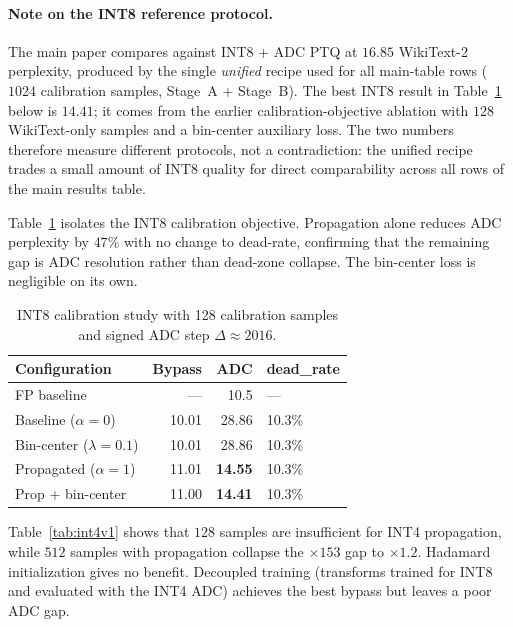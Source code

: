\documentclass[letterpaper]{article} %
\theoremstyle{plain}
\begin{document}
\paragraph{Note on the INT8 reference protocol.}
The main paper compares against INT8 + ADC PTQ at $16.85$ WikiText-2 perplexity, produced by the single \emph{unified} recipe used for all main-table rows ($1024$ calibration samples, Stage~A + Stage~B). The best INT8 result in Table~\ref{tab:int8} below is $14.41$; it comes from the earlier calibration-objective ablation with $128$ WikiText-only samples and a bin-center auxiliary loss. The two numbers therefore measure different protocols, not a contradiction: the unified recipe trades a small amount of INT8 quality for direct comparability across all rows of the main results table.

Table~\ref{tab:int8} isolates the INT8 calibration objective. Propagation alone reduces ADC perplexity by $47\%$ with no change to dead-rate, confirming that the remaining gap is ADC resolution rather than dead-zone collapse. The bin-center loss is negligible on its own.

\begin{table}[htbp]
\centering
\begin{tabular}{@{}lrrl@{}}
\toprule
\textbf{Configuration} & \textbf{Bypass} & \textbf{ADC} & \textbf{dead\_rate} \\
\midrule
FP baseline            & ---   & 10.5  & --- \\
Baseline ($\alpha=0$)  & 10.01 & 28.86 & 10.3\% \\
Bin-center ($\lambda=0.1$) & 10.01 & 28.86 & 10.3\% \\
Propagated ($\alpha=1$)    & 11.01 & \textbf{14.55} & 10.3\% \\
Prop + bin-center          & 11.00 & \textbf{14.41} & 10.3\% \\
\bottomrule
\end{tabular}
\caption{INT8 calibration study with 128 calibration samples and signed ADC step $\Delta\approx2016$.}
\label{tab:int8}
\end{table}

Table~\ref{tab:int4v1} shows that $128$ samples are insufficient for INT4 propagation, while $512$ samples with propagation collapse the $\times153$ gap to $\times1.2$. Hadamard initialization gives no benefit. Decoupled training (transforms trained for INT8 and evaluated with the INT4 ADC) achieves the best bypass but leaves a poor ADC gap.
\end{document}
